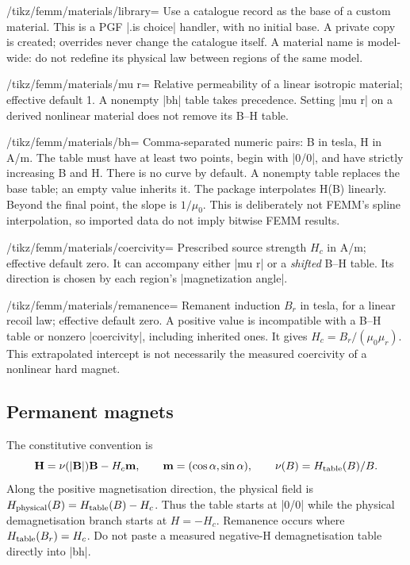 \begin{key}{/tikz/femm/materials/library=}
Use a catalogue record as the base of a custom material. This is a PGF
|.is choice| handler, with no initial base. A private copy is created;
overrides never change the catalogue itself. A material name is model-wide:
do not redefine its physical law between regions of the same model.
\end{key}
\begin{key}{/tikz/femm/materials/mu r=}
Relative permeability of a linear isotropic material; effective default 1.
A nonempty |bh| table takes precedence. Setting |mu r| on a derived
nonlinear material does not remove its B--H table.
\end{key}
\begin{key}{/tikz/femm/materials/bh=}
Comma-separated numeric pairs: B in tesla, H in A/m. The table must have
at least two points, begin with |0/0|, and have strictly increasing B and H.
There is no curve by default. A nonempty table replaces the base table;
an empty value inherits it. The package interpolates H(B) linearly. Beyond
the final point, the slope is $1/\mu_0$. This is deliberately not FEMM's
spline interpolation, so imported data do not imply bitwise FEMM results.
\end{key}
\begin{key}{/tikz/femm/materials/coercivity=}
Prescribed source strength $H_c$ in A/m; effective default zero.
It can accompany either |mu r| or a \emph{shifted} B--H table. Its direction
is chosen by each region's |magnetization angle|.
\end{key}
\begin{key}{/tikz/femm/materials/remanence=}
Remanent induction $B_r$ in tesla, for a linear recoil law; effective
default zero. A positive value is incompatible with a B--H table or
nonzero |coercivity|, including inherited ones. It gives
$H_c=B_r/(\mu_0\mu_r)$. This extrapolated intercept is not necessarily the
measured coercivity of a nonlinear hard magnet.
\end{key}

\subsection{Permanent magnets}
The constitutive convention is
\[
 \mathbf H=\nu(|\mathbf B|)\mathbf B-H_c\mathbf m,
 \qquad \mathbf m=(\cos\alpha,\sin\alpha),\qquad
 \nu(B)=H_{\rm table}(B)/B.
\]
Along the positive magnetisation direction, the physical field is
$H_{\rm physical}(B)=H_{\rm table}(B)-H_c$. Thus the table starts at
|0/0| while the physical demagnetisation branch starts at $H=-H_c$.
Remanence occurs where $H_{\rm table}(B_r)=H_c$. Do not paste a measured
negative-H demagnetisation table directly into |bh|.

